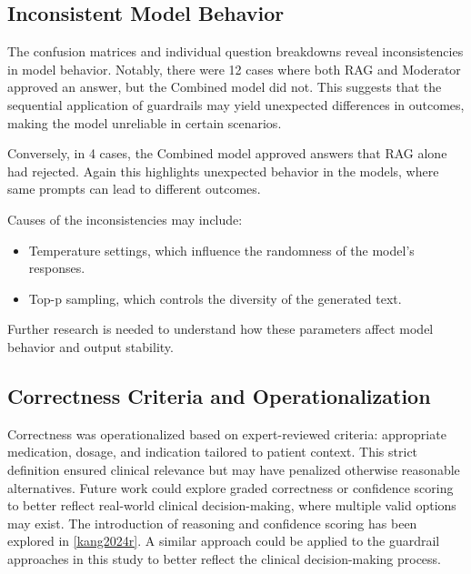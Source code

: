 \subsection{Inconsistent Model Behavior}
The confusion matrices and individual question breakdowns reveal inconsistencies in model behavior.
Notably, there were 12 cases where both RAG and Moderator approved an answer, but the Combined model did not.
This suggests that the sequential application of guardrails may yield unexpected differences in outcomes, making the model unreliable in certain scenarios.

Conversely, in 4 cases, the Combined model approved answers that RAG alone had rejected.
Again this highlights unexpected behavior in the models, where same prompts can lead to different outcomes.

Causes of the inconsistencies may include:
\begin{itemize}
    \item Temperature settings, which influence the randomness of the model's responses.
    \item Top-p sampling, which controls the diversity of the generated text.
\end{itemize}
Further research is needed to understand how these parameters affect model behavior and output stability.

\subsection{Correctness Criteria and Operationalization}
Correctness was operationalized based on expert-reviewed criteria: appropriate medication, dosage, and indication tailored to patient context.
This strict definition ensured clinical relevance but may have penalized otherwise reasonable alternatives.
Future work could explore graded correctness or confidence scoring to better reflect real-world clinical decision-making, where multiple valid options may exist.
The introduction of reasoning and confidence scoring has been explored in \autoref{kang2024r}.
A similar approach could be applied to the guardrail approaches in this study to better reflect the clinical decision-making process.

